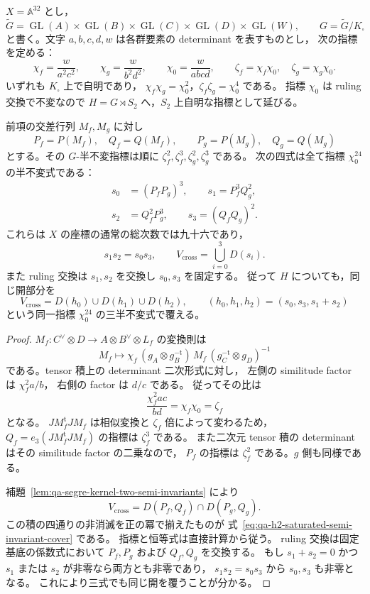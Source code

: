 $X=\mathbb A^{32}$ とし，
\[
 \widetilde G=
 \operatorname{GL}(A)\times\operatorname{GL}(B)
 \times\operatorname{GL}(C)\times\operatorname{GL}(D)
 \times\operatorname{GL}(W),\qquad
 G=\widetilde G/K_\square
\]
と書く。文字 $a,b,c,d,w$ は各群要素の determinant を表すものとし，
次の指標を定める：
\[
 \chi_f=\frac{w}{a^2c^2},\qquad
 \chi_g=\frac{w}{b^2d^2},\qquad
 \chi_0=\frac{w}{abcd},\qquad
 \zeta_f=\chi_f\chi_0,\quad \zeta_g=\chi_g\chi_0.
 \tag{CH}\label{eq:qa-h2-git-characters}
\]
いずれも $K_\square$ 上で自明であり，
$\chi_f\chi_g=\chi_0^2$，$\zeta_f\zeta_g=\chi_0^4$ である。
指標 $\chi_0$ は ruling 交換で不変なので
$H=G\rtimes S_2$ へ，$S_2$ 上自明な指標として延びる。

\begin{proposition}[共通指標の半不変式による飽和被覆]
\label{prop:qa-h2-common-character-saturated-cover}
前項の交差行列 $M_f,M_g$ に対し
\[
 P_f=P(M_f),\quad Q_f=Q(M_f),\qquad
 P_g=P(M_g),\quad Q_g=Q(M_g)
\]
とする。その $G$-半不変指標は順に
$\zeta_f^2,\zeta_f^3,\zeta_g^2,\zeta_g^3$ である。
次の四式は全て指標 $\chi_0^{24}$ の半不変式である：
\[
 \begin{split}
 s_0&=(P_fP_g)^3,\qquad s_1=P_f^3Q_g^2,\\
 s_2&=Q_f^2P_g^3,\qquad s_3=(Q_fQ_g)^2.
 \end{split}
 \tag{SS}\label{eq:qa-h2-four-common-semi-invariants}
\]
これらは $X$ の座標の通常の総次数では九十六であり，
\[
 s_1s_2=s_0s_3,\qquad
 V_{\mathrm{cross}}=\bigcup_{i=0}^3D(s_i).
 \tag{SAT}\label{eq:qa-h2-saturated-semi-invariant-cover}
\]
また ruling 交換は $s_1,s_2$ を交換し $s_0,s_3$ を固定する。
従って $H$ についても，同じ開部分を
\[
 V_{\mathrm{cross}}=D(h_0)\cup D(h_1)\cup D(h_2),\qquad
 (h_0,h_1,h_2)=(s_0,s_3,s_1+s_2)
 \tag{UN}\label{eq:qa-h2-three-unordered-semi-invariants}
\]
という同一指標 $\chi_0^{24}$ の三半不変式で覆える。
\end{proposition}
\begin{proof}
$M_f:C^\vee\otimes D\to A\otimes B^\vee\otimes L_f$ の変換則は
\[
 M_f\longmapsto
  \chi_f\,(g_A\otimes g_B^{-{\mathrm{t}}})\,
  M_f\,(g_C^{-{\mathrm{t}}}\otimes g_D)^{-1}
\]
である。tensor 積上の determinant 二次形式に対し，
左側の similitude factor は $\chi_f^2a/b$，
右側の factor は $d/c$ である。
従ってその比は
\[
 \frac{\chi_f^2ac}{bd}=\chi_f\chi_0=\zeta_f
\]
となる。
$JM_f^{\mathrm{t}}JM_f$ は相似変換と $\zeta_f$ 倍によって変わるため，
$Q_f=e_3(JM_f^{\mathrm{t}}JM_f)$ の指標は $\zeta_f^3$ である。
また二次元 tensor 積の determinant はその similitude factor の二乗なので，
$P_f$ の指標は $\zeta_f^2$ である。$g$ 側も同様である。

補題~\ref{lem:qa-segre-kernel-two-semi-invariants} により
\[
 V_{\mathrm{cross}}=D(P_f,Q_f)\cap D(P_g,Q_g).
\]
この積の四通りの非消滅を正の冪で揃えたものが
式~\eqref{eq:qa-h2-saturated-semi-invariant-cover} である。
指標と恒等式は直接計算から従う。
ruling 交換は固定基底の係数式において $P_f,P_g$ および $Q_f,Q_g$ を交換する。
もし $s_1+s_2=0$ かつ $s_1$ または $s_2$ が非零なら両方とも非零であり，
$s_1s_2=s_0s_3$ から $s_0,s_3$ も非零となる。
これにより三式でも同じ開を覆うことが分かる。
\end{proof}

